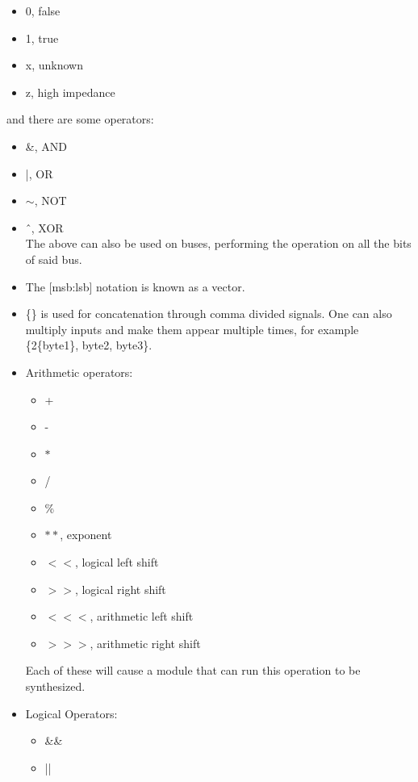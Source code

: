 \documentclass[nobib]{tufte-handout}
\begin{document}
    \begin{itemize}
        \item 0, false
        \item 1, true
        \item x, unknown
        \item z, high impedance
    \end{itemize}
    and there are some operators:
    \begin{itemize}
        \item \&, AND
        \item |, OR
        \item $\sim$, NOT
        \item ˆ, XOR\\
              The above can also be used on buses, performing the operation on all the bits of said bus.
        \item The [msb:lsb] notation is known as a vector.\\
        \item \{\} is used for concatenation through comma divided signals. One can also multiply inputs and make them appear multiple times, for example \{2\{byte1\}, byte2, byte3\}.
        \item Arithmetic operators:
              \begin{itemize}
                  \item +
                  \item -
                  \item $*$
                  \item /
                  \item \%
                  \item $**$, exponent
                  \item $<<$, logical left shift
                  \item $>>$, logical right shift
                  \item $<<<$, arithmetic left shift
                  \item $>>>$, arithmetic right shift
              \end{itemize}
              Each of these will cause a module that can run this operation to be synthesized.
        \item Logical Operators:
              \begin{itemize}
                  \item \&\&
                  \item ||

\end{itemize}
\end{itemize}
\end{document}
